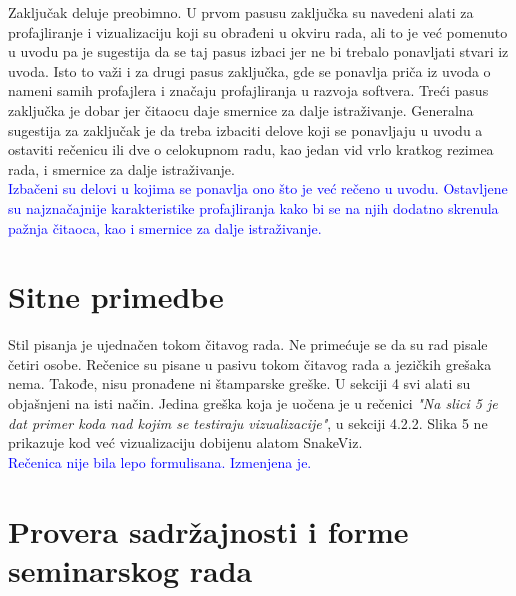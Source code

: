 \documentclass[a4paper]{report}
\newcommand{\odgovor}[1]{\textcolor{blue}{#1}}
\begin{document}
Zaključak deluje preobimno. U prvom pasusu zaključka su navedeni alati za profajliranje i vizualizaciju koji su obrađeni u okviru rada, ali to je već pomenuto u uvodu pa je sugestija da se taj pasus izbaci jer ne bi trebalo ponavljati stvari iz uvoda. Isto to važi i za drugi pasus zaključka, gde se ponavlja priča iz uvoda o nameni samih profajlera i značaju profajliranja u razvoja softvera. Treći pasus zaključka je dobar jer čitaocu daje smernice za dalje istraživanje. Generalna sugestija za zaključak je da treba izbaciti delove koji se ponavljaju u uvodu a ostaviti rečenicu ili dve o celokupnom radu, kao jedan vid vrlo kratkog rezimea rada, i smernice za dalje istraživanje.\\
\odgovor{Izbačeni su delovi u kojima se ponavlja ono što je već rečeno u uvodu. Ostavljene su najznačajnije karakteristike profajliranja kako bi se na njih dodatno skrenula pažnja čitaoca, kao i smernice za dalje istraživanje.}


\section{Sitne primedbe}
Stil pisanja je ujednačen tokom čitavog rada. Ne primećuje se da su rad pisale četiri osobe. Rečenice su pisane u pasivu tokom čitavog rada a jezičkih grešaka nema. Takođe, nisu pronađene ni štamparske greške. U sekciji 4 svi alati su objašnjeni na isti način. Jedina greška koja je uočena je u rečenici \emph{"Na slici 5 je dat primer koda nad kojim se testiraju vizualizacije"}, u sekciji 4.2.2. Slika 5 ne prikazuje kod već vizualizaciju dobijenu alatom SnakeViz.\\
\odgovor{Rečenica nije bila lepo formulisana. Izmenjena je.}

\section{Provera sadržajnosti i forme seminarskog rada}
\end{document}
